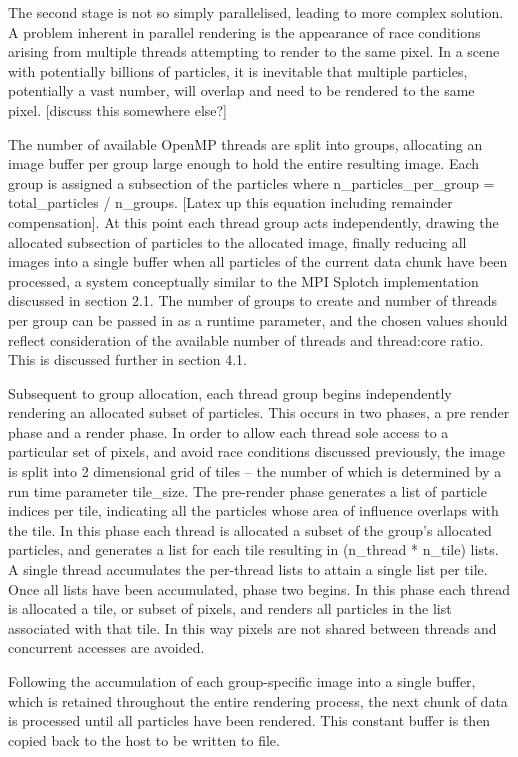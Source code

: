 \documentclass{easychair}
\begin{document}
The second stage is not so simply parallelised, leading to more complex solution. A problem inherent in parallel 
rendering is the appearance of race conditions arising from multiple threads attempting to render to the same pixel. 
In a scene with potentially billions of particles, it is inevitable that multiple particles, potentially a vast number, 
will overlap and need to be rendered to the same pixel. [discuss this somewhere else?]

The number of available OpenMP threads are split into groups, allocating an image buffer per group large enough to hold 
the entire resulting image. Each group is assigned a subsection of the particles where 
n\_particles\_per\_group = total\_particles / n\_groups. [Latex up this equation including remainder compensation]. At this 
point each thread group acts independently, drawing the allocated subsection of particles to the allocated image, finally 
reducing all images into a single buffer when all particles of the current data chunk have been processed, a system 
conceptually similar to the MPI Splotch implementation discussed in section 2.1. The number of groups to create and 
number of threads per group can be passed in as a runtime parameter, and the chosen values should reflect consideration 
of the available number of threads and thread:core ratio. This is discussed further in section 4.1.

Subsequent to group allocation, each thread group begins independently rendering an allocated subset of particles. This 
occurs in two phases, a pre render phase and a render phase. In order to allow each thread sole access to a particular 
set of pixels, and avoid race conditions discussed previously, the image is split into 2 dimensional grid of tiles – 
the number of which is determined by a run time parameter tile\_size. The pre-render phase generates a list of particle 
indices per tile, indicating all the particles whose area of influence overlaps with the tile. In this phase each thread 
is allocated a subset of the group's allocated particles, and generates a list for each tile resulting in 
(n\_thread * n\_tile) lists. A single thread accumulates the per-thread lists to attain a single list per tile. 
Once all lists have been accumulated, phase two begins. In this phase each thread is allocated a tile, or subset of 
pixels, and renders all particles in the list associated with that tile. In this way pixels are not shared between 
threads and concurrent accesses are avoided.

Following the accumulation of each group-specific image into a single buffer, which is retained throughout the entire 
rendering process, the next chunk of data is processed until all particles have been rendered. This constant buffer is 
then copied back to the host to be written to file. 
\end{document}

